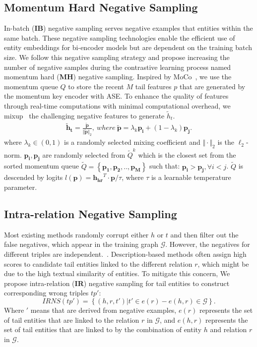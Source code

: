 \documentclass[11pt]{article}
\begin{document}
\subsection{Momentum Hard Negative Sampling}
In-batch ($\textbf{IB}$) negative sampling \cite{Wang2022SimKGCSC} serves negative examples that entities within the same batch. These negative sampling technologies enable the efficient use of entity embeddings for bi-encoder models but are dependent on the training batch size. We follow this negative sampling strategy and propose increasing the number of negative samples during the contrastive learning process named momentum hard (\textbf{MH}) negative sampling. Inspired by MoCo~\cite{he2020momentum}, we use the momentum queue $Q$ to store the recent $M$ tail features $p$ that are generated by the momentum key encoder with ASE. To enhance the quality of features through real-time computations with minimal computational overhead, we mixup~\cite{Kalantidis2020HardNM} the challenging negative features to generate $\tilde{h}_{t}$. 
\begin{equation}
\begin{aligned}
    \mathbf{\tilde{h}_{t}}=\frac{\mathbf{\tilde{p}}}{\Vert \mathbf{\tilde{p}} \Vert_2}, \ where \
    \mathbf{\tilde{p}} = \lambda_{k} \mathbf{p_{i}} + (1 - \lambda_{k})\mathbf{p_{j}}.
    \end{aligned}
\end{equation}
where $\lambda_{k} \in (0, 1)$ is a randomly selected mixing coefficient and $\Vert \cdot \Vert_2$ is the $\ell_{2}$-norm. $\mathbf{p_{i}}, \mathbf{p_{j}}$ are randomly selected from $\tilde{Q}^{k}$ which is the closest set from the sorted momentum queue $\tilde{Q}=\left\{\mathbf{p_{1}},\mathbf{p_{2}},..,\mathbf{p_{M}}\right\}$ such that: $\mathbf{p_{i}}> \mathbf{p_{j}}, \forall i < j$. $\tilde{Q}$ is descended by logits $l(\mathbf{p})=\mathbf{h_{hr}}^T \cdot \mathbf{p}/\tau$, where $\tau$ is a learnable temperature parameter.

\subsection{Intra-relation Negative Sampling}

Most existing methods randomly corrupt either $h$ or $t$ and then filter out the false negatives, which appear in the training graph $\mathcal{G}$. However, the negatives for different triples are independent.~\cite{sun2018rotate, Wang2020StructureAugmentedTR}. Description-based methods often assign high scores to candidate tail entities linked to the different relation $r$, which might be due to the high textual similarity of entities. To mitigate this concern, We propose intra-relation (\textbf{IR}) negative sampling for tail entities to construct corresponding wrong triples $tp'$:
\begin{equation}
	IRNS(tp') = \left\{(h,r,t') | t' \in e(r) - e(h,r) \in \mathcal{G}\right\}.
\end{equation}
Where $'$ means that are derived from negative examples, $e(r)$ represents the set of tail entities that are linked to the relation $r$ in $\mathcal{G}$, and $e(h,r)$ represents the set of tail entities that are linked to by the combination of entity $h$ and relation $r$ in $\mathcal{G}$.
\end{document}
